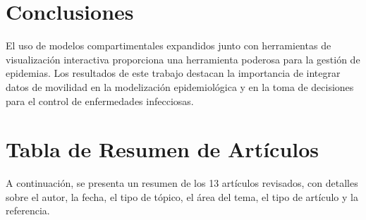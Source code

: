 \documentclass[sigconf]{acmart}
\begin{document}
\section{Conclusiones}
El uso de modelos compartimentales expandidos junto con herramientas de visualización interactiva proporciona una herramienta poderosa para la gestión de epidemias. Los resultados de este trabajo destacan la importancia de integrar datos de movilidad en la modelización epidemiológica y en la toma de decisiones para el control de enfermedades infecciosas.

\section{Tabla de Resumen de Artículos}
A continuación, se presenta un resumen de los 13 artículos revisados, con detalles sobre el autor, la fecha, el tipo de tópico, el área del tema, el tipo de artículo y la referencia.
\end{document}
